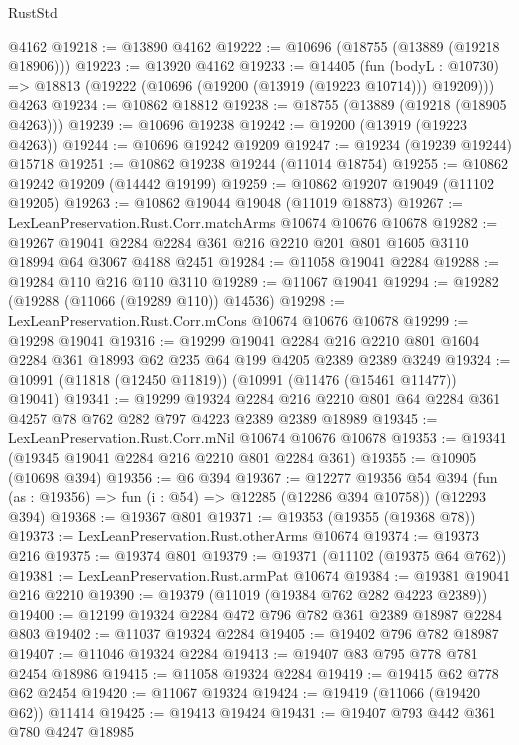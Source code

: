 \begin{lexlean}{RustStd}
\begin{coremodule}
    @4162
@19218 := @13890 @4162
@19222 := @10696 (@18755 (@13889 (@19218 @18906)))
@19223 := @13920 @4162
@19233 := @14405
    (fun (bodyL : @10730) => @18813 (@19222 (@10696 (@19200 (@13919 (@19223 @10714))) @19209)))
    @4263
@19234 := @10862 @18812
@19238 := @18755 (@13889 (@19218 (@18905 @4263)))
@19239 := @10696 @19238
@19242 := @19200 (@13919 (@19223 @4263))
@19244 := @10696 @19242 @19209
@19247 := @19234 (@19239 @19244) @15718
@19251 := @10862 @19238 @19244 (@11014 @18754)
@19255 := @10862 @19242 @19209 (@14442 @19199)
@19259 := @10862 @19207 @19049 (@11102 @19205)
@19263 := @10862 @19044 @19048 (@11019 @18873)
@19267 := LexLeanPreservation.Rust.Corr.matchArms @10674 @10676 @10678
@19282 := @19267
    @19041
    @2284
    @2284
    @361
    @216
    @2210
    @201
    @801
    @1605
    @3110
    @18994
    @64
    @3067
    @4188
    @2451
@19284 := @11058 @19041 @2284
@19288 := @19284 @110 @216 @110 @3110
@19289 := @11067 @19041
@19294 := @19282 (@19288 (@11066 (@19289 @110)) @14536)
@19298 := LexLeanPreservation.Rust.Corr.mCons @10674 @10676 @10678
@19299 := @19298 @19041
@19316 := @19299
    @19041
    @2284
    @216
    @2210
    @801
    @1604
    @2284
    @361
    @18993
    @62
    @235
    @64
    @199
    @4205
    @2389
    @2389
    @3249
@19324 := @10991 (@11818 (@12450 @11819)) (@10991 (@11476 (@15461 @11477)) @19041)
@19341 := @19299
    @19324
    @2284
    @216
    @2210
    @801
    @64
    @2284
    @361
    @4257
    @78
    @762
    @282
    @797
    @4223
    @2389
    @2389
    @18989
@19345 := LexLeanPreservation.Rust.Corr.mNil @10674 @10676 @10678
@19353 := @19341 (@19345 @19041 @2284 @216 @2210 @801 @2284 @361)
@19355 := @10905 (@10698 @394)
@19356 := @6 @394
@19367 := @12277
    @19356
    @54
    @394
    (fun (as : @19356) => fun (i : @54) => @12285 (@12286 @394 @10758))
    (@12293 @394)
@19368 := @19367 @801
@19371 := @19353 (@19355 (@19368 @78))
@19373 := LexLeanPreservation.Rust.otherArms @10674
@19374 := @19373 @216
@19375 := @19374 @801
@19379 := @19371 (@11102 (@19375 @64 @762))
@19381 := LexLeanPreservation.Rust.armPat @10674
@19384 := @19381 @19041 @216 @2210
@19390 := @19379 (@11019 (@19384 @762 @282 @4223 @2389))
@19400 := @12199 @19324 @2284 @472 @796 @782 @361 @2389 @18987 @2284 @803
@19402 := @11037 @19324 @2284
@19405 := @19402 @796 @782 @18987
@19407 := @11046 @19324 @2284
@19413 := @19407 @83 @795 @778 @781 @2454 @18986
@19415 := @11058 @19324 @2284
@19419 := @19415 @62 @778 @62 @2454
@19420 := @11067 @19324
@19424 := @19419 (@11066 (@19420 @62)) @11414
@19425 := @19413 @19424
@19431 := @19407 @793 @442 @361 @780 @4247 @18985

\end{coremodule}
\end{lexlean}
